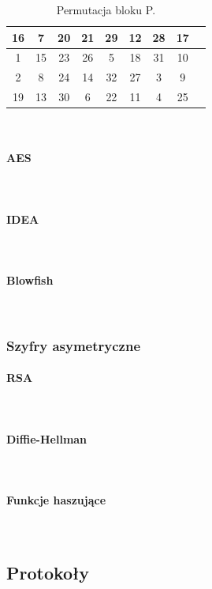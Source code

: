 \documentclass[12p]{article}
\begin{document}
\begin{table}[H]
\centering
\begin{tabular}{|c|c|c|c|c|c|c|c|c|}
\hline
16 &	7 &	20& 	21& 	29& 	12& 	28& 	17\\ \hline
1 &	15& 	23& 	26& 	5& 	18& 	31& 	10\\ \hline
2 &	8 &	24 &	14& 	32& 	27& 	3 &	9\\ \hline
19 	&13 &	30& 	6& 	22& 	11& 	4& 	25\\ \hline
\end{tabular}
\caption{Permutacja bloku P.}~\label{blok_P}
\end{table}





\paragraph{AES} \mbox{} \\
\paragraph{IDEA} \mbox{} \\
\paragraph{Blowfish} \mbox{} \\


\subsubsection{Szyfry asymetryczne}
\paragraph{RSA} \mbox{} \\
\paragraph{Diffie-Hellman} \mbox{} \\
\paragraph{Funkcje haszujące} \mbox{} \\

\subsection{Protokoły}
\end{document}
